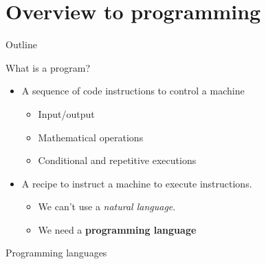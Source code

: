 \documentclass{beamer}%
\begin{document}
\section{Overview to programming}
\begin{frame}{Outline}
\tableofcontents[currentsection]
\end{frame}


\begin{frame}{What is a program?}
\begin{itemize}
\item A sequence of code instructions to control a machine
\begin{itemize}
\item Input/output
\item Mathematical operations
\item Conditional and repetitive executions
\end{itemize}
\item A recipe to instruct a machine to execute instructions. 
\begin{itemize}
\item We can't use a \emph{natural language}. 
\item We need a \textbf{programming language}
\end{itemize}
\end{itemize}
\end{frame}

\begin{frame}{Programming languages}
\centering
{}
{\scriptsize{}}
\end{frame}
\end{document}
